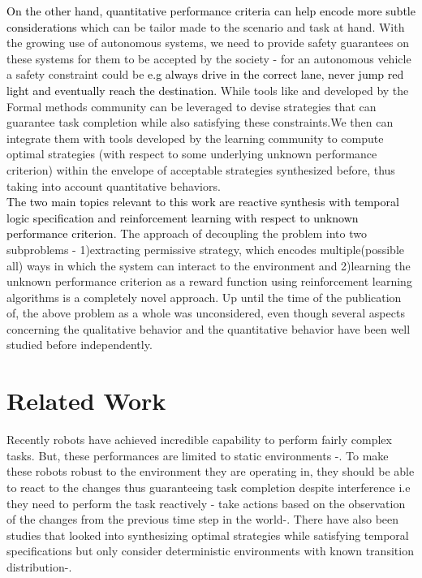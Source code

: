 \documentclass[letterpaper, 10 pt, conference]{ieeeconf}  %
\begin{document}
\textcolor{black}{On the other hand, quantitative performance criteria can help encode more subtle considerations} which can be tailor made to the scenario and task at hand. With the growing use of autonomous systems, we need to provide safety guarantees on these systems for them to be accepted by the society - for an autonomous vehicle a safety constraint could be \textcolor{black} {e.g always drive in the correct lane, never jump red light and eventually reach the destination}. While tools like \cite{c2} and \cite{c3} developed by the Formal methods community can be leveraged to devise strategies that can guarantee task completion while also satisfying these constraints.We then can integrate them with tools developed by the learning community to compute optimal strategies (with respect to some underlying unknown performance criterion) within the envelope of acceptable strategies synthesized before, thus taking into account quantitative  behaviors. \\

\textcolor{black}{The two main topics relevant to this work are reactive synthesis with temporal logic specification and reinforcement learning with respect to unknown performance criterion}.  The approach of decoupling the problem into two subproblems - 1)extracting permissive strategy\cite{c4}, which encodes multiple(possible all) ways in which the system can interact to the environment and 2)learning the unknown performance criterion as a reward function using reinforcement learning algorithms is a completely novel approach. Up until the time of the publication of\cite{c1}, the above problem as a whole was unconsidered, even though several aspects concerning the qualitative behavior and the quantitative behavior have been well studied before independently.

\section{Related Work}

Recently robots have achieved incredible capability to perform fairly complex tasks. But, these performances are limited to static environments \cite{c4}-\cite{c8}. To make these robots robust to the environment they are operating in, they should be able to react to the changes thus guaranteeing task completion despite interference i.e they need to perform the task reactively - take actions based on the observation of the changes from the previous time step in the world\cite{c9}-\cite{c10}. There have also been studies that looked into synthesizing optimal strategies while satisfying temporal specifications but only consider deterministic environments with known transition distribution\cite{c11}-\cite{c12}.\\
\end{document}
